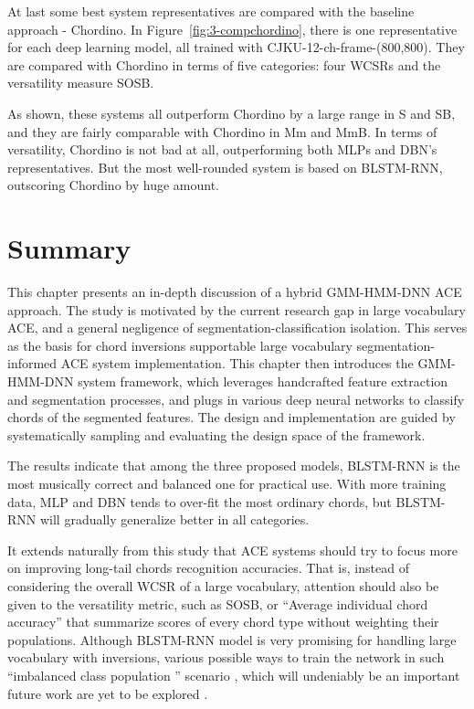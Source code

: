 At last some best system representatives are compared with the baseline approach - Chordino. In Figure~\ref{fig:3-compchordino}, there is one representative for each deep learning model, all trained with CJKU-12-ch-frame-(800,800). They are compared with Chordino in terms of five categories: four WCSRs and the versatility measure SOSB.

As shown, these systems all outperform Chordino by a large range in S and SB, and they are fairly comparable with Chordino in Mm and MmB. In terms of versatility, Chordino is not bad at all, outperforming both MLPs and DBN's representatives. But the most well-rounded system is based on BLSTM-RNN, outscoring Chordino by huge amount.

\section{Summary} \label{sec:3-concln}
This chapter presents an in-depth discussion of a hybrid GMM-HMM-DNN ACE approach. The study is motivated by the current research gap in large vocabulary ACE, and a general negligence of segmentation-classification isolation. This serves as the basis for chord inversions supportable large vocabulary segmentation-informed ACE system implementation. This chapter then introduces the GMM-HMM-DNN system framework, which leverages handcrafted feature extraction and segmentation processes, and plugs in various deep neural networks to classify chords of the segmented features. The design and implementation are guided by systematically sampling and evaluating the design space of the framework.

The results indicate that among the three proposed models, BLSTM-RNN is the most musically correct and balanced one for practical use.  With more training data, MLP and DBN tends to over-fit the most ordinary chords, but BLSTM-RNN will gradually generalize better in all categories.

It extends naturally from this study that ACE systems should try to focus more on improving long-tail chords recognition accuracies. That is, instead of considering the overall WCSR of a large vocabulary, attention should also be given to the versatility metric, such as SOSB, or ``Average individual chord accuracy'' \cite{cho2014improved} that summarize scores of every chord type without weighting their populations. Although BLSTM-RNN model is very promising for handling large vocabulary with inversions, various possible ways to train the network in such ``imbalanced class population '' scenario \cite{chawla2004editorial}, which will undeniably be an important future work are yet to be explored .

